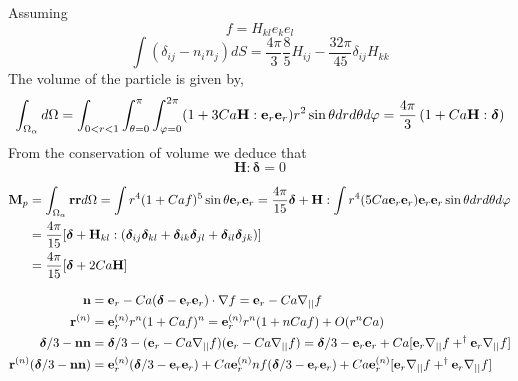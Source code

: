 Assuming 
\begin{equation}
    f = H_{kl} e_ke_l
\end{equation}
\begin{equation}
    \int (\delta_{ij} - n_in_j) dS 
    =
    \frac{4\pi}{3}\frac{8}{5}
    H_{ij}
    - \frac{32\pi}{45}\delta_{ij} H_{kk}
\end{equation}
The volume of the particle is given by, 
\begin{equation}
    \int_{\Omega_{\alpha}}  d\Omega=
    \int_{0<r<1}
    \int_{\theta = 0}^\pi
    \int_{\varphi = 0}^{2\pi}
    (1+3 Ca \textbf{H}:\textbf{e}_r\textbf{e}_r) r^2 \sin\theta dr d\theta d\varphi
    =
    \frac{4\pi}{3}\left(
        1
        +
        Ca \textbf{H}:\bm\delta 
    \right)
\end{equation}
From the conservation of volume we deduce that
\begin{equation}
    \textbf{H}:\bm\delta 
    =
    0 
\end{equation}


\begin{align}
    \textbf{M}_p
    &=
    \int_{\Omega_{\alpha}} \textbf{rr} d\Omega
    =
    \int{r^4 (1+ Ca f)^5 \sin\theta \textbf{e}_r \textbf{e}_r }
    =
    \frac{4\pi}{15}\bm\delta+
    \textbf{H}: 
    \int{r^4 (5 Ca \textbf{e}_r \textbf{e}_r) \textbf{e}_r \textbf{e}_r }\sin\theta dr d\theta d\varphi\\
    &=
    \frac{4\pi}{15}[\bm\delta+
    \textbf{H}_{kl}: (
        \bm\delta_{ij}
        \bm\delta_{kl}
        +\bm\delta_{ik}
        \bm\delta_{jl}
        +\bm\delta_{il}
        \bm\delta_{jk}
    )
    ]\\
    &=
    \frac{4\pi}{15}[\bm\delta+
    2 Ca \textbf{H}
    ]
\end{align}


\begin{align}
    \textbf{n} 
    &= \textbf{e}_r - Ca (\bm\delta - \textbf{e}_r\textbf{e}_r)\cdot \mathbf{\nabla} f
    = \textbf{e}_r - Ca  \mathbf{\nabla}_{||} f\\
    \textbf{r}^{(n)} 
    &= \textbf{e}_r^{(n)} r^n (1+ Ca f)^n
    = \textbf{e}_r^{(n)} r^n (1+ n Ca f) + O(r^n Ca)\\
    \bm\delta/3 - \textbf{nn} 
    &=
    \bm\delta/3
    - (\textbf{e}_r - Ca \mathbf{\nabla}_{||} f)
    (\textbf{e}_r - Ca \mathbf{\nabla}_{||} f)
    =
    \bm\delta/3
    - \textbf{e}_r\textbf{e}_r
    + Ca [
        \textbf{e}_r \mathbf{\nabla}_{||} f
        + ^\dagger \textbf{e}_r \mathbf{\nabla}_{||} f
    ]\\
    \textbf{r}^{(n)}(\bm\delta/3 - \textbf{nn}) 
    &=
    \textbf{e}_r^{(n)}(\bm\delta/3
    - \textbf{e}_r\textbf{e}_r)
    + Ca  \textbf{e}_r^{(n)} n f (\bm\delta/3
    - \textbf{e}_r\textbf{e}_r)
    + Ca \textbf{e}_r^{(n)} [
        \textbf{e}_r \mathbf{\nabla}_{||} f
        + ^\dagger \textbf{e}_r \mathbf{\nabla}_{||} f
    ]
\end{align}

